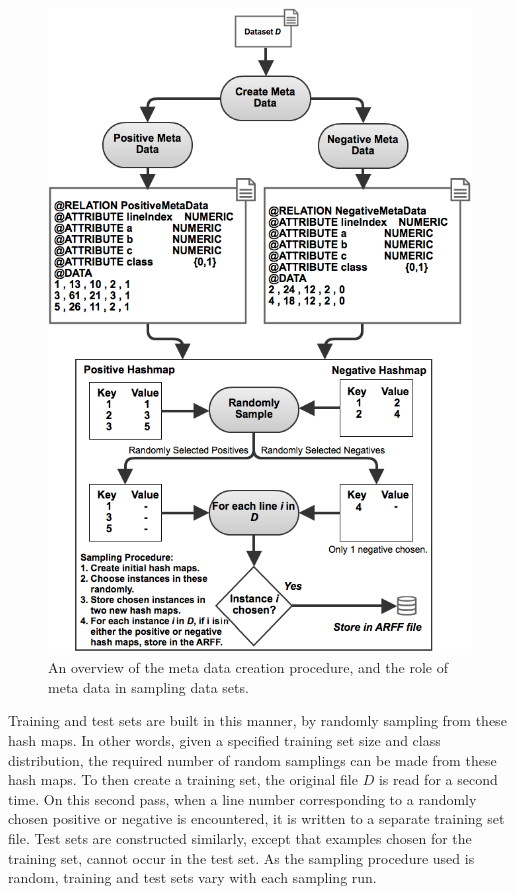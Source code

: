 \documentclass[twoside,a4paper]{refart}
\begin{document}
\begin{figure}[!htbp]
\begin{center}
      \includegraphics[keepaspectratio,scale=0.45]{MetaData.png}
    \fi
    \caption[An overview of the meta data creation procedure, and the role of meta data in sampling data sets.]{An overview of the meta data creation procedure, and the role of meta data in sampling data sets.}
    \label{metadataroleinsampling}
  \end{center}
\end{figure}
Training and test sets are built in this manner, by randomly sampling from these hash maps. In other words, given a specified training set size and class distribution, the required number of random samplings can be made from these hash maps. To then create a training set, the original file $D$ is read for a second time. On this second pass, when a line number corresponding to a randomly chosen positive or negative is encountered, it is written to a separate training set file. Test sets are constructed similarly, except that examples chosen for the training set, cannot occur in the test set. As the sampling procedure used is random, training and test sets vary with each sampling run.
\end{document}
